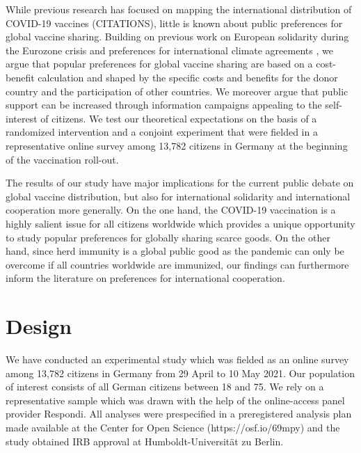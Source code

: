 \documentclass[12pt,oneside,smallheadings,chapterprefix=true]{article}
\begin{document}
While previous research has focused on mapping the international distribution of COVID-19 vaccines (CITATIONS), little is known about public preferences for global vaccine sharing. Building on previous work on European solidarity during the Eurozone crisis \citep{Bechtel2017,Kuhn2018,Kuhn2020,Stoeckel2018} and preferences for international climate agreements \citep{Bechtel2013,Bechtel2017,Bechtel2019},  
we argue that popular preferences for global vaccine sharing are based on a cost-benefit calculation and shaped by the specific costs and benefits for the donor country and the participation of other countries. We moreover argue that public support can be increased through information campaigns appealing to the self-interest of citizens. We test our theoretical expectations on the basis of a randomized intervention and a conjoint experiment that were fielded in a representative online survey among 13,782 citizens in Germany at the beginning of the vaccination roll-out. 

The results of our study have major implications for the current public debate on global vaccine distribution, but also for international solidarity and international cooperation more generally. On the one hand, the COVID-19 vaccination is a highly salient issue for all citizens worldwide which provides a unique opportunity to study popular preferences for globally sharing scarce goods. On the other hand, since herd immunity is a global public good as the pandemic can only be overcome if all countries worldwide are immunized, our findings can furthermore inform the literature on preferences for international cooperation. 




\section*{Design}
\label{sec:design}

We have conducted an experimental study which was fielded as an online survey among 13,782 citizens in Germany from 29 April to 10 May 2021. Our population of interest consists of all German citizens between 18 and 75. We rely on a representative sample which was drawn with the help of the online-access panel provider \hspace{0pt}Respondi\hspace{0pt}\hspace{0pt}. All analyses were prespecified in a preregistered analysis plan made available at the Center for Open Science (https://osf.io/69mpy) and the study obtained IRB approval at Humboldt-Universität zu Berlin.
  
\end{document}
